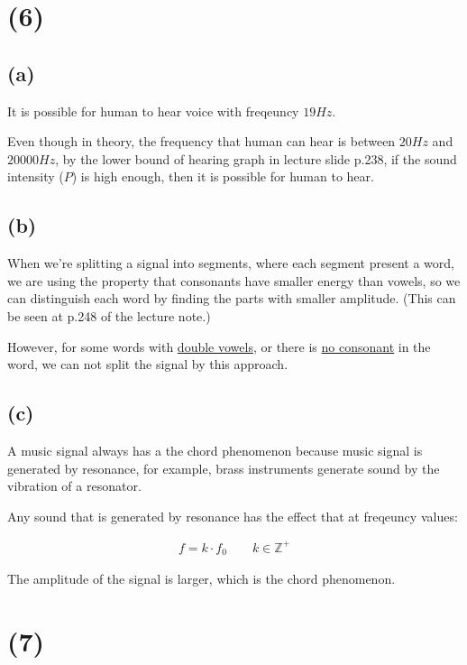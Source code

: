\documentclass{article}
\begin{document}
\section*{(6)}

\subsection*{(a)}

It is possible for human to hear voice with freqeuncy $19Hz$.
\bigskip

Even though in theory, the frequency that human can hear is between $20Hz$ and $20000Hz$,
by the lower bound of hearing graph in lecture slide p.238, if the sound intensity ($P$) is high enough,
then it is possible for human to hear.

\subsection*{(b)}

When we're splitting a signal into segments, where each segment present a word, 
we are using the property that consonants have smaller energy than vowels, 
so we can distinguish each word by finding the parts with smaller amplitude.
(This can be seen at p.248 of the lecture note.)
\bigskip

However, for some words with \underline{double vowels}, or there is \underline{no consonant} in the word, 
we can not split the signal by this approach.

\subsection*{(c)}

A music signal always has a the chord phenomenon because music signal is generated by resonance, 
for example, brass instruments generate sound by the vibration of a resonator.
\bigskip

Any sound that is generated by resonance has the effect that at freqeuncy values:

\begin{align*}
    f = k \cdot f_0 \qquad k \in \mathbb{Z}^+
\end{align*}

The amplitude of the signal is larger, which is the chord phenomenon.

\section*{(7)}
\end{document}
